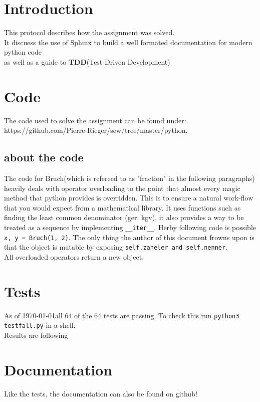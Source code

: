 \documentclass[letterpaper, 12pt]{article}
\begin{document}
\section{Introduction}
This protocol describes how the assignment was solved. \\
It discuess the use of Sphinx to build a well formated documentation for modern python code \\
as well as a guide to \textbf{TDD}(Test Driven Development)

\section{Code}
The code used to solve the assignment can be found under: \\
https://github.com/Pierre-Rieger/sew/tree/master/python. \\

\subsection{about the code}
The code for Bruch(which is refereed to as "fraction" in the following paragraphs) heavily deals with operator overloading to the point that 
almost every magic method that python provides is overridden. This is to ensure a natural work-flow that you would expect from a mathematical library.
It uses functions such as finding the least common denominator (ger: kgv), it also provides a way to be treated as a sequence by implementing \verb|__iter__|.
Herby following code is possible \verb|x, y = Bruch(1, 2)|.
The only thing the author of this document frowns upon is that the object is mutable by exposing \verb|self.zaheler and self.nenner|.\\

All overloaded operators return a new object.

\section{Tests}
As of \today all 64 of the 64 tests are passing.
To check this run \verb|python3 testfall.py| in a shell. \\
Results are following \\


\section{Documentation}
Like the tests, the documentation can also be found on github!



\clearpage



\listoftables
\lstlistoflistings
\listoffigures


	
\end{document}
